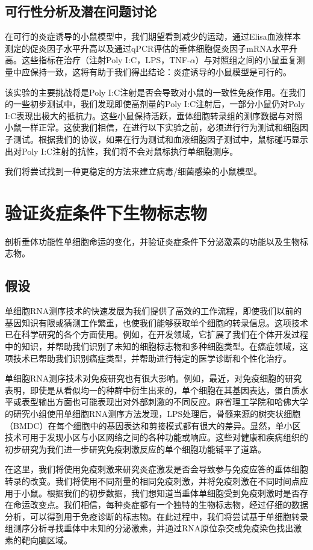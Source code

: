 \subsection{可行性分析及潜在问题讨论}
  在可行的炎症诱导的小鼠模型中，我们期望看到减少的运动，通过Elisa血液样本测定的促炎因子水平升高以及通过qPCR评估的垂体细胞促炎因子mRNA水平升高。这些指标在治疗（注射Poly I:C，LPS，TNF-$\alpha$）与对照组之间的小鼠重复测量中应保持一致，这将有助于我们得出结论：炎症诱导的小鼠模型是可行的。

  该实验的主要挑战将是Poly I:C注射是否会导致对小鼠的一致性免疫作用。在我们的一些初步测试中，我们发现即使高剂量的Poly I:C注射后，一部分小鼠仍对Poly I:C表现出极大的抵抗力。这些小鼠保持活跃，垂体细胞转录组的测序数据与对照小鼠一样正常。这使我们相信，在进行以下实验之前，必须进行行为测试和细胞因子测试。根据我们的协议，如果在行为测试和血液细胞因子测试中，鼠标碰巧显示出对Poly I:C注射的抗性，我们将不会对鼠标执行单细胞测序。

  我们将尝试找到一种更稳定的方法来建立病毒/细菌感染的小鼠模型。

\section{验证炎症条件下生物标志物}
  剖析垂体功能性单细胞命运的变化，并验证炎症条件下分泌激素的功能以及生物标志物。
\subsection{假设}
  单细胞RNA测序技术的快速发展为我们提供了高效的工作流程，即使我们以前的基因知识有限或猜测工作繁重，也使我们能够获取单个细胞的转录信息。这项技术已在科学研究的各个方面使用。例如，在开发领域，它扩展了我们在个体开发过程中的知识，并帮助我们识别了未知的细胞标志物和多种细胞类型。在癌症领域，这项技术已帮助我们识别癌症类型，并帮助进行特定的医学诊断和个性化治疗。

  单细胞RNA测序技术对免疫研究也有很大影响。例如，最近，对免疫细胞的研究表明，即使是从看似均一的种群中衍生出来的，单个细胞在其基因表达，蛋白质水平或表型输出方面也可能表现出对外部刺激的不同反应。麻省理工学院和哈佛大学的研究小组使用单细胞RNA测序方法发现，LPS处理后，骨髓来源的树突状细胞（BMDC）在每个细胞中的基因表达和剪接模式都有很大的差异。显然，单小区技术可用于发现小区与小区网络之间的各种功能或响应。这些对健康和疾病组织的初步研究为我们进一步研究免疫刺激反应的单个细胞功能铺平了道路。

  在这里，我们将使用免疫刺激来研究炎症激发是否会导致参与免疫应答的垂体细胞转录的改变。我们将使用不同剂量的相同免疫刺激，并将免疫刺激在不同时间点应用于小鼠。根据我们的初步数据，我们想知道当垂体单细胞受到免疫刺激时是否存在命运改变点。我们相信，每种炎症都有一个独特的生物标志物，经过仔细的数据分析，可以得到用于免疫诊断的标志物。在此过程中，我们将尝试基于单细胞转录组测序分析寻找垂体中未知的分泌激素，并通过RNA原位杂交或免疫染色找出激素的靶向脑区域。

